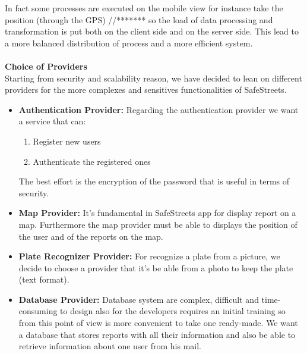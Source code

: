 \documentclass[../RASD.tex]{subfiles}
\begin{document}
    In fact some processes are executed on the mobile view for instance take the position (through the GPS) //******* so the load of data processing
    and transformation is put both on the client side and on the server side.
    This lead to a more balanced distribution of process and a more efficient system.
    \\
    \\
    \textbf{Choice of Providers} \\
    Starting from security and scalability reason, we have decided to lean on different providers for the more complexes and sensitives functionalities of SafeStreets.
    \begin{itemize}
        \item \textbf{Authentication Provider:} Regarding the authentication provider we want a service that can: \begin{enumerate}
                                                                                                                     \item Register new users
                                                                                                                     \item Authenticate the registered ones
                                                                                                                 \end{enumerate}
        The best effort is the encryption of the password that is useful in terms of security.
        \item \textbf{Map Provider:} It’s fundamental in SafeStreets app for display report on a map.
        Furthermore the map provider must be able to displays the position of the user and of the reports on the map.
        \item \textbf{Plate Recognizer Provider:} For recognize a plate from a picture, we decide to choose a provider that it’s be able from a photo
        to keep the plate (text format).
        \item \textbf{Database Provider:} Database system are complex, difficult and time-consuming to design also for the developers
        requires an initial training so from this point of view is more convenient to take one ready-made.
        We want a database that stores reports with all their information and also be able to retrieve information about one user from his mail.
    \end{itemize}
\end{document}
